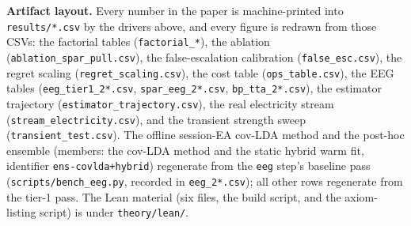 \textbf{Artifact layout.}
Every number in the paper is machine-printed into \texttt{results/*.csv} by the drivers above, and every figure is redrawn from those CSVs: the factorial tables (\texttt{factorial\_*}), the ablation (\texttt{ablation\_spar\_pull.csv}), the false-escalation calibration (\texttt{false\_esc.csv}), the regret scaling (\texttt{regret\_scaling.csv}), the cost table (\texttt{ops\_table.csv}), the EEG tables (\texttt{eeg\_tier1\_2*.csv}, \texttt{spar\_eeg\_2*.csv}, \texttt{bp\_tta\_2*.csv}), the estimator trajectory (\texttt{estimator\_trajectory.csv}), the real electricity stream (\texttt{stream\_electricity.csv}), and the transient strength sweep (\texttt{transient\_test.csv}).
The offline session-EA cov-LDA method and the post-hoc ensemble (members: the cov-LDA method and the static hybrid warm fit, identifier \texttt{ens-covlda+hybrid}) regenerate from the \texttt{eeg} step's baseline pass (\texttt{scripts/bench\_eeg.py}, recorded in \texttt{eeg\_2*.csv}); all other rows regenerate from the tier-1 pass.
The Lean material (six files, the build script, and the axiom-listing script) is under \texttt{theory/lean/}.

